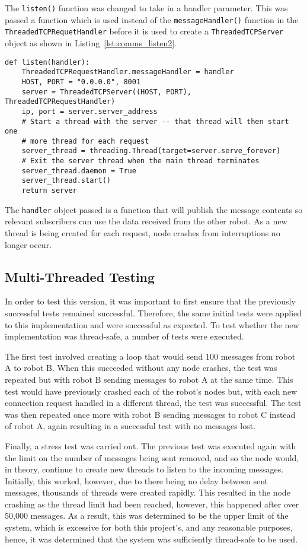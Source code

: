 The \verb|listen()| function was changed to take in a handler parameter. This was
passed a function which is used instead of the \verb|messageHandler()| function in
the \verb|ThreadedTCPRequetHandler| before it is used to create a \verb|ThreadedTCPServer|
object as shown in Listing~\ref{lst:comms_listen2}.

\begin{lstlisting}[caption={listen() Function 2.0}, label={lst:comms_listen2}]
def listen(handler):
    ThreadedTCPRequestHandler.messageHandler = handler
    HOST, PORT = "0.0.0.0", 8001
    server = ThreadedTCPServer((HOST, PORT), ThreadedTCPRequestHandler)
    ip, port = server.server_address
    # Start a thread with the server -- that thread will then start one
    # more thread for each request
    server_thread = threading.Thread(target=server.serve_forever)
    # Exit the server thread when the main thread terminates
    server_thread.daemon = True
    server_thread.start()
    return server
\end{lstlisting}

The \verb|handler| object passed is a function that will publish the message contents so
relevant subscribers can use the data received from the other robot. As a new
thread is being created for each request, node crashes from interruptions no longer occur.

\subsection{Multi-Threaded Testing}\label{soft/comms/mttest}
In order to test this version, it was important to first ensure that the
previously successful tests remained successful. Therefore,
the same initial tests were applied to this implementation and were
successful as expected. To test whether the new implementation was
thread-safe, a number of tests were executed.

The first test involved creating a loop that would send 100 messages from robot
A to robot B. When this succeeded without any node crashes, the test was repeated
but with robot B sending messages to robot A at the same time. This test would
have previously crashed each of the robot's nodes but, with each new connection
request handled in a different thread, the test was successful. The test was then
repeated once more with robot B sending messages to robot C instead of robot A,
again resulting in a successful test with no messages lost.

Finally, a stress test was carried out. The previous test was executed again with
the limit on the number of messages being sent removed, and so the node would,
in theory, continue to create new threads to listen to the incoming messages.
Initially, this worked, however, due to there being no delay between sent messages,
thousands of threads were created rapidly. This resulted in the node
crashing as the thread limit had been reached, however, this happened after over
50,000 messages. As a result, this was determined to be the upper limit of the system,
which is excessive for both this project's, and any reasonable purposes, hence, it was
determined that the system was sufficiently thread-safe to be used.

